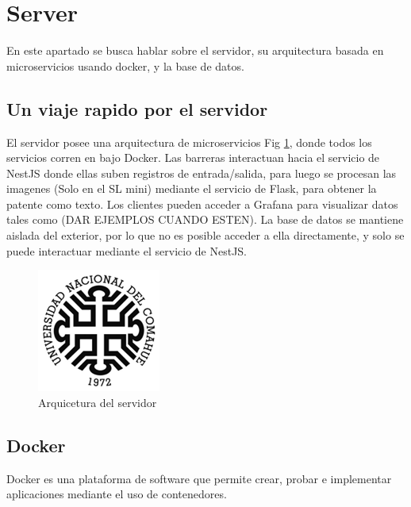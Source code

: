 \section{Server}

En este apartado se busca hablar sobre el servidor, su arquitectura basada en microservicios usando docker, y la base de datos.

\subsection{Un viaje rapido por el servidor}

El servidor posee una arquitectura de microservicios Fig \ref{fig:server}, donde todos los servicios corren en bajo Docker. Las barreras interactuan hacia el servicio de NestJS donde ellas suben registros de entrada/salida, para luego se procesan las imagenes (Solo en el SL mini) mediante el servicio de Flask, para obtener la patente como texto. Los clientes pueden acceder a Grafana para visualizar datos tales como (DAR EJEMPLOS CUANDO ESTEN). La base de datos se mantiene aislada del exterior, por lo que no es posible acceder a ella directamente, y solo se puede interactuar mediante el servicio de NestJS.

\begin{figure}
        \centering
        \includegraphics[width=.5\textwidth]{imgs/uncoma.png}
        \caption{Arquicetura del servidor}
        \label{fig:server}
\end{figure}

\subsection{Docker}

Docker es una plataforma de software que permite crear, probar e implementar aplicaciones mediante el uso de contenedores.

